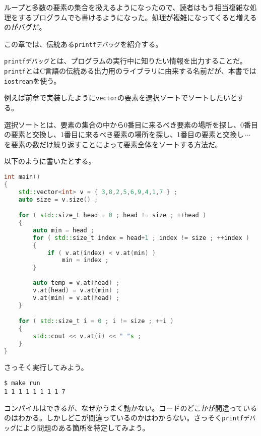 
ループと多数の要素の集合を扱えるようになったので、読者はもう相当複雑な処理をするプログラムでも書けるようになった。処理が複雑になってくると増えるのがバグだ。

この章では、伝統ある\texttt{printfデバッグ}を紹介する。

\texttt{printfデバッグ}とは、プログラムの実行中に知りたい情報を出力することだ。\texttt{printf}とはC言語の伝統ある出力用のライブラリに由来する名前だが、本書では\texttt{iostream}を使う。


例えば前章で実装したように\texttt{vector}の要素を選択ソートでソートしたいとする。

選択ソートとは、要素の集合の中から0番目に来るべき要素の場所を探し、0番目の要素と交換し、1番目に来るべき要素の場所を探し、1番目の要素と交換し{$\,\cdots\,$}を要素の数だけ繰り返すことによって要素全体をソートする方法だ。

以下のように書いたとする。

\begin{lstlisting}[language={C++}]
int main()
{
    std::vector<int> v = { 3,8,2,5,6,9,4,1,7 } ;
    auto size = v.size() ;

    for ( std::size_t head = 0 ; head != size ; ++head )
    {
        auto min = head ;
        for ( std::size_t index = head+1 ; index != size ; ++index )
        {
            if ( v.at(index) < v.at(min) )
                min = index ;
        }
        
        auto temp = v.at(head) ;
        v.at(head) = v.at(min) ;
        v.at(min) = v.at(head) ;
    }

    for ( std::size_t i = 0 ; i != size ; ++i )
    {
        std::cout << v.at(i) << " "s ;
    }
}
\end{lstlisting}

さっそく実行してみよう。

\begin{lstlisting}[style=terminal]
$ make run
1 1 1 1 1 1 1 1 7
\end{lstlisting}

コンパイルはできるが、なぜかうまく動かない。コードのどこかが間違っているのはわかる。しかしどこが間違っているのかはわからない。さっそく\texttt{printfデバッグ}により問題のある箇所を特定してみよう。


